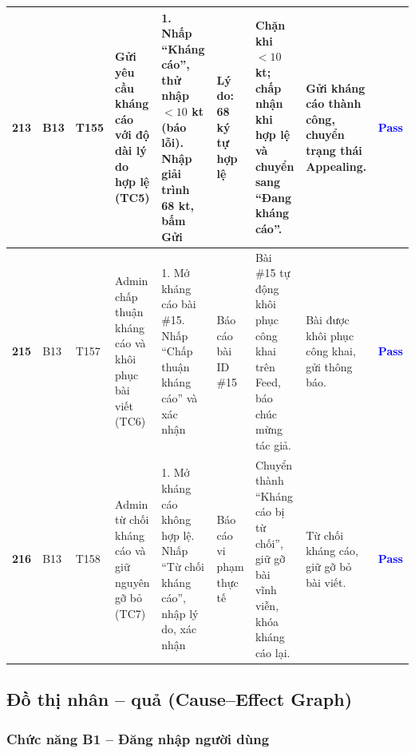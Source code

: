 \documentclass[11pt,a4paper]{article}
\begin{document}
\begin{longtable}{|C{0.8cm}|C{0.75cm}|C{0.95cm}|L{2.0cm}|L{3.0cm}|L{2.25cm}|L{2.6cm}|L{2.5cm}|C{0.85cm}|}
\textbf{213} & B13 & T155 & Gửi yêu cầu kháng cáo với độ dài lý do hợp lệ (TC5) & 1. Nhấp ``Kháng cáo'', thử nhập $< 10$ kt (báo lỗi). Nhập giải trình 68 kt, bấm Gửi & Lý do: 68 ký tự hợp lệ & Chặn khi $< 10$ kt; chấp nhận khi hợp lệ và chuyển sang ``Đang kháng cáo''. & Gửi kháng cáo thành công, chuyển trạng thái Appealing. & \textcolor{blue}{\textbf{Pass}} \\ \hline
\textbf{215} & B13 & T157 & Admin chấp thuận kháng cáo và khôi phục bài viết (TC6) & 1. Mở kháng cáo bài \#15. Nhấp ``Chấp thuận kháng cáo'' và xác nhận & Báo cáo bài ID \#15 & Bài \#15 tự động khôi phục công khai trên Feed, báo chúc mừng tác giả. & Bài được khôi phục công khai, gửi thông báo. & \textcolor{blue}{\textbf{Pass}} \\ \hline
\textbf{216} & B13 & T158 & Admin từ chối kháng cáo và giữ nguyên gỡ bỏ (TC7) & 1. Mở kháng cáo không hợp lệ. Nhấp ``Từ chối kháng cáo'', nhập lý do, xác nhận & Báo cáo vi phạm thực tế & Chuyển thành ``Kháng cáo bị từ chối'', giữ gỡ bài vĩnh viễn, khóa kháng cáo lại. & Từ chối kháng cáo, giữ gỡ bỏ bài viết. & \textcolor{blue}{\textbf{Pass}} \\ \hline
\end{longtable}
\endgroup

\subsection{Đồ thị nhân -- quả (Cause--Effect Graph)}

\subsubsection{Chức năng B1 -- Đăng nhập người dùng}
\end{document}
